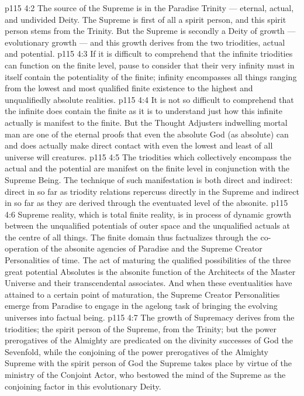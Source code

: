 \vs p115 4:2 The source of the Supreme is in the Paradise Trinity --- eternal, actual, and undivided Deity. The Supreme is first of all a spirit person, and this spirit person stems from the Trinity. But the Supreme is secondly a Deity of growth --- evolutionary growth --- and this growth derives from the two triodities, actual and potential.
\vs p115 4:3 If it is difficult to comprehend that the infinite triodities can function on the finite level, pause to consider that their very infinity must in itself contain the potentiality of the finite; infinity encompasses all things ranging from the lowest and most qualified finite existence to the highest and unqualifiedly absolute realities.
\vs p115 4:4 It is not so difficult to comprehend that the infinite does contain the finite as it is to understand just how this infinite actually is manifest to the finite. But the Thought Adjusters indwelling mortal man are one of the eternal proofs that even the absolute God (as absolute) can and does actually make direct contact with even the lowest and least of all universe will creatures.
\vs p115 4:5 The triodities which collectively encompass the actual and the potential are manifest on the finite level in conjunction with the Supreme Being. The technique of such manifestation is both direct and indirect: direct in so far as triodity relations repercuss directly in the Supreme and indirect in so far as they are derived through the eventuated level of the absonite.
\vs p115 4:6 Supreme reality, which is total finite reality, is in process of dynamic growth between the unqualified potentials of outer space and the unqualified actuals at the centre of all things. The finite domain thus factualizes through the co\hyp{}operation of the absonite agencies of Paradise and the Supreme Creator Personalities of time. The act of maturing the qualified possibilities of the three great potential Absolutes is the absonite function of the Architects of the Master Universe and their transcendental associates. And when these eventualities have attained to a certain point of maturation, the Supreme Creator Personalities emerge from Paradise to engage in the agelong task of bringing the evolving universes into factual being.
\vs p115 4:7 The growth of Supremacy derives from the triodities; the spirit person of the Supreme, from the Trinity; but the power prerogatives of the Almighty are predicated on the divinity successes of God the Sevenfold, while the conjoining of the power prerogatives of the Almighty Supreme with the spirit person of God the Supreme takes place by virtue of the ministry of the Conjoint Actor, who bestowed the mind of the Supreme as the conjoining factor in this evolutionary Deity.
